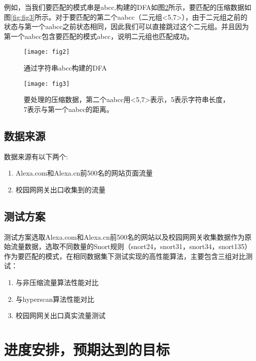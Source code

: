 例如，当我们要匹配的模式串是abcc,构建的DFA如图\ref{fig:fig2}所示，要匹配的压缩数据如图\ref{fig:fig3}所示。对于要匹配的第二个aabcc（二元组<5,7>），由于二元组之前的状态与第一个aabcc之前状态相同，因此我们可以直接跳过这个二元组。并且因为第一个aabcc包含要匹配的模式abcc，说明二元组也匹配成功。

\begin{figure}[h]
    \centering
    \texttt{[image: fig2]}
    \caption{通过字符串abcc构建的DFA}
    \label{fig:fig1}
\end{figure}

\begin{figure}[h]
    \centering
    \texttt{[image: fig3]}
    \caption{要处理的压缩数据，第二个aabcc用<5,7>表示，5表示字符串长度，7表示与第一个aabcc的距离。}
    \label{fig:fig2}
\end{figure}

\vspace{3mm}
\subsection{数据来源}
数据来源有以下两个:
\begin{enumerate}
  \item Alexa.com和Alexa.cn前500名的网站页面流量
  \item 校园网网关出口收集到的流量
\end{enumerate}

\vspace{3mm}
\subsection{测试方案}
测试方案选取Alexa.com和Alexa.cn前500名的网站以及校园网网关收集数据作为原始流量数据，选取不同数量的Snort规则（snort24，snort31，snort34，snort135）作为要匹配的模式，在相同数据集下测试实现的高性能算法，主要包含三组对比测试：
\begin{enumerate}
  \item 与非压缩流量算法性能对比
  \item 与hyperscan算法性能对比
  \item 校园网网关出口真实流量测试
\end{enumerate}

\vspace{8mm}
\section{进度安排，预期达到的目标}

